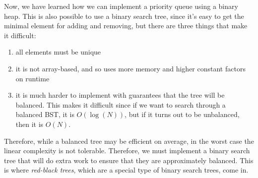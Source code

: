  Now, we have learned how we can implement a priority queue using a binary heap. This is also possible to use a binary search tree, since it's easy to get the minimal element for adding and removing, but there are three things that make it difficult: 
  \begin{enumerate}
      \item all elements must be unique 
      \item it is not array-based, and so uses more memory and higher constant factors on runtime 
      \item it is much harder to implement with guarantees that the tree will be balanced. This makes it difficult since if we want to search through a balanced BST, it is $O(\log(N))$, but if it turns out to be unbalanced, then it is $O(N)$. 
  \end{enumerate}
  Therefore, while a balanced tree may be efficient on average, in the worst case the linear complexity is not tolerable. Therefore, we must implement a binary search tree that will do extra work to ensure that they are approximately balanced. This is where \textit{red-black trees}, which are a special type of binary search trees, come in.  

